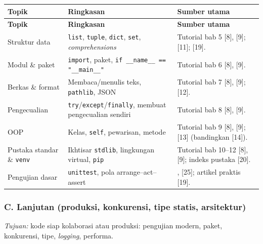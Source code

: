 \documentclass[12pt,a4paper]{article}
\begin{document}
{\small\setlength{\tabcolsep}{2.5pt}
\begin{longtable}{@{}>{\raggedright\arraybackslash}p{3.05cm}>{\raggedright\arraybackslash}p{5.25cm}>{\raggedright\arraybackslash}p{6.35cm}@{}}
\toprule
\textbf{Topik} & \textbf{Ringkasan} & \textbf{Sumber utama} \\
\midrule
\endfirsthead
\toprule
\textbf{Topik} & \textbf{Ringkasan} & \textbf{Sumber utama} \\
\midrule
\endhead
\midrule
\endfoot
\bottomrule
\endlastfoot
Struktur data &
\texttt{list}, \texttt{tuple}, \texttt{dict}, \texttt{set}, \textit{comprehensions} &
Tutorial bab 5 [8], [9]; [11]; [19]. \\
\midrule
Modul \& paket &
\texttt{import}, paket, \texttt{if \_\_name\_\_ == "\_\_main\_\_"} &
Tutorial bab 6 [8], [9]. \\
\midrule
Berkas \& format &
Membaca/menulis teks, \texttt{pathlib}, JSON &
Tutorial bab 7 [8], [9]; [12]. \\
\midrule
Pengecualian &
\texttt{try}/\texttt{except}/\texttt{finally}, membuat pengecualian sendiri &
Tutorial bab 8 [8], [9]. \\
\midrule
OOP &
Kelas, \texttt{self}, pewarisan, metode &
Tutorial bab 9 [8], [9]; [13] (bandingkan [14]). \\
\midrule
Pustaka standar \& \texttt{venv} &
Ikhtisar \texttt{stdlib}, lingkungan virtual, \texttt{pip} &
Tutorial bab 10--12 [8], [9]; indeks pustaka [20]. \\
\midrule
Pengujian dasar &
\texttt{unittest}, pola arrange--act--assert &
[24], [25]; artikel praktis [19]. \\
\end{longtable}
}

\subsubsection*{C. Lanjutan (produksi, konkurensi, tipe statis, arsitektur)}

\noindent\textit{Tujuan:} kode siap kolaborasi atau produksi: pengujian modern, paket, konkurensi, tipe, \textit{logging}, performa.
\end{document}
